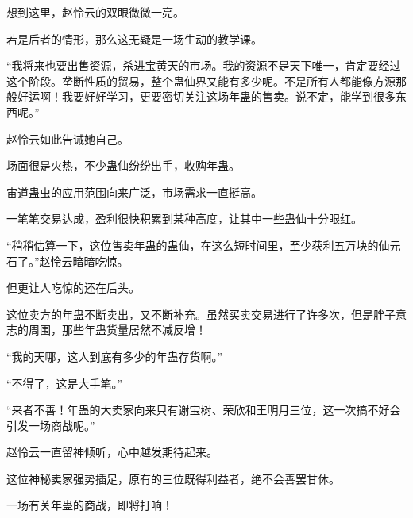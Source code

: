 \begin{this_body}
想到这里，赵怜云的双眼微微一亮。

若是后者的情形，那么这无疑是一场生动的教学课。

“我将来也要出售资源，杀进宝黄天的市场。我的资源不是天下唯一，肯定要经过这个阶段。垄断性质的贸易，整个蛊仙界又能有多少呢。不是所有人都能像方源那般好运啊！我要好好学习，更要密切关注这场年蛊的售卖。说不定，能学到很多东西呢。”

赵怜云如此告诫她自己。

场面很是火热，不少蛊仙纷纷出手，收购年蛊。

宙道蛊虫的应用范围向来广泛，市场需求一直挺高。

一笔笔交易达成，盈利很快积累到某种高度，让其中一些蛊仙十分眼红。

“稍稍估算一下，这位售卖年蛊的蛊仙，在这么短时间里，至少获利五万块的仙元石了。”赵怜云暗暗吃惊。

但更让人吃惊的还在后头。

这位卖方的年蛊不断卖出，又不断补充。虽然买卖交易进行了许多次，但是胖子意志的周围，那些年蛊货量居然不减反增！

“我的天哪，这人到底有多少的年蛊存货啊。”

“不得了，这是大手笔。”

“来者不善！年蛊的大卖家向来只有谢宝树、荣欣和王明月三位，这一次搞不好会引发一场商战呢。”

赵怜云一直留神倾听，心中越发期待起来。

这位神秘卖家强势插足，原有的三位既得利益者，绝不会善罢甘休。

一场有关年蛊的商战，即将打响！

\end{this_body}

